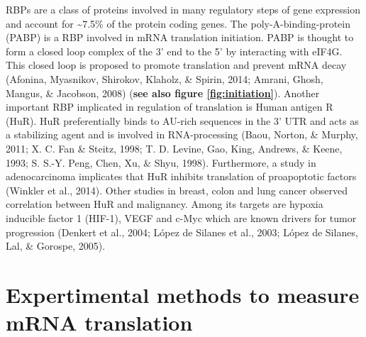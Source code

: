 \documentclass[12pt,openany]{book}
\begin{document}
RBPs are a class of proteins involved in many regulatory steps of gene
expression and account for \textasciitilde{}7.5\% of the protein coding
genes. The poly-A-binding-protein (PABP) is a RBP involved in mRNA
translation initiation. PABP is thought to form a closed loop complex of
the 3' end to the 5' by interacting with eIF4G. This closed loop is
proposed to promote translation and prevent mRNA decay (Afonina,
Myasnikov, Shirokov, Klaholz, \& Spirin, 2014; Amrani, Ghosh, Mangus, \&
Jacobson, 2008) (\textbf{see also figure \ref{fig:initiation}}). Another
important RBP implicated in regulation of translation is Human antigen R
(HuR). HuR preferentially binds to AU-rich sequences in the 3' UTR and
acts as a stabilizing agent and is involved in RNA-processing (Baou,
Norton, \& Murphy, 2011; X. C. Fan \& Steitz, 1998; T. D. Levine, Gao,
King, Andrews, \& Keene, 1993; S. S.-Y. Peng, Chen, Xu, \& Shyu, 1998).
Furthermore, a study in adenocarcinoma implicates that HuR inhibits
translation of proapoptotic factors (Winkler et al., 2014). Other
studies in breast, colon and lung cancer observed correlation between
HuR and malignancy. Among its targets are hypoxia inducible factor 1
(HIF-1), VEGF and c-Myc which are known drivers for tumor progression
(Denkert et al., 2004; López de Silanes et al., 2003; López de Silanes,
Lal, \& Gorospe, 2005). \clearpage
\section{Expertimental methods to measure mRNA translation} \label{exptMethod}
\end{document}
